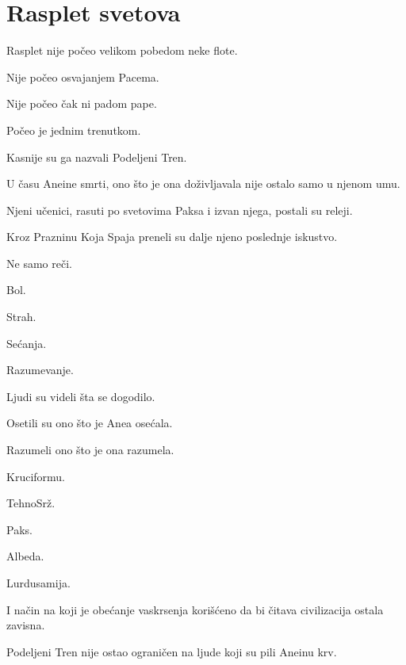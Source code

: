
\chapter{Rasplet svetova}


Rasplet nije počeo velikom pobedom neke flote.

Nije počeo osvajanjem Pacema.

Nije počeo čak ni padom pape.

\bigskip

Počeo je jednim trenutkom.

\bigskip

Kasnije su ga nazvali Podeljeni Tren.

\bigskip

U času Aneine smrti, ono što je ona doživljavala nije ostalo samo u njenom umu.

Njeni učenici, rasuti po svetovima Paksa i izvan njega, postali su releji.

\bigskip

Kroz Prazninu Koja Spaja preneli su dalje njeno poslednje iskustvo.

\bigskip

Ne samo reči.

\bigskip

Bol.

Strah.

Sećanja.

Razumevanje.

\bigskip

Ljudi su videli šta se dogodilo.

\bigskip

Osetili su ono što je Anea osećala.

Razumeli ono što je ona razumela.

\bigskip

Kruciformu.

TehnoSrž.

Paks.

Albeda.

Lurdusamija.

\bigskip

I način na koji je obećanje vaskrsenja korišćeno da bi čitava civilizacija ostala zavisna.

\bigskip

Podeljeni Tren nije ostao ograničen na ljude koji su pili Aneinu krv.

